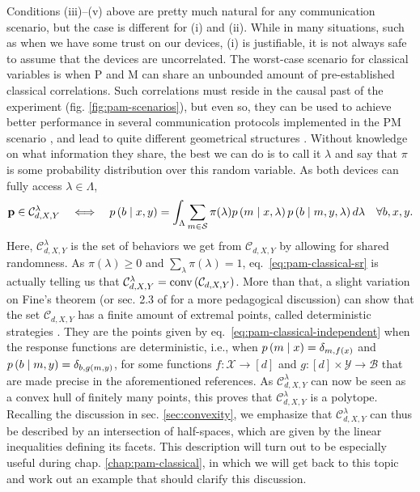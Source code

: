             Conditions (iii)--(v) above are pretty much natural for any communication scenario, but the case is different for (i) and (ii). While in many situations, such as when we have some trust on our devices, (i) is justifiable, it is not always safe to assume that the devices are uncorrelated. The worst-case scenario for classical variables is when P and M can share an unbounded amount of pre-established classical correlations. Such correlations must reside in the causal past of the experiment (fig. \ref{fig:pam-scenarios}), but even so, they can be used to achieve better performance in several communication protocols implemented in the PM scenario \cite{de_vicente_bound_2019}, and lead to quite different geometrical structures \cite{de_vicente_shared_2017,dallarno_robustness_2012}. Without knowledge on what information they share, the best we can do is to call it $\lambda$ and say that $\pi$ is some probability distribution over this random variable. As both devices can fully access $\lambda \in \Lambda$,
            \begin{equation}
                \mathbf{p} \in \mathcal{C}_{d,X,Y}^\lambda \quad\Longleftrightarrow \quad p \left( b \mid x,y \right) = \int_{\Lambda} \sum_{m \in \mathcal{S}} \pi(\lambda) p \left( m \mid x,\lambda \right) p \left( b \mid m,y,\lambda \right) d\lambda \quad\forall b,x,y .
                \label{eq:pam-classical-sr}
            \end{equation}
            Here, $\mathcal{C}_{d,X,Y}^\lambda$ is the set of behaviors we get from $\mathcal{C}_{d,X,Y}$ by allowing for shared randomness. As $\pi(\lambda) \geq 0$ and $\sum_\lambda \pi(\lambda) = 1$, eq.~\eqref{eq:pam-classical-sr} is actually telling us that $\mathcal{C}_{d,X,Y}^\lambda = \text{conv} \left( \mathcal{C}_{d,X,Y} \right)$. More than that, a slight variation on Fine's theorem \cite{fine_hidden_1982} (or sec. 2.3 of \cite{scarani_bell_2019} for a more pedagogical discussion) can show that the set $\mathcal{C}_{d,X,Y}$ has a finite amount of extremal points, called deterministic strategies \cite{gallego_pam_2010,de_vicente_bound_2019}. They are the points given by eq.~\eqref{eq:pam-classical-independent} when the response functions are deterministic, i.e., when $p \left( m \mid x \right) = \delta_{m,f(x)}$ and $ p \left( b \mid m,y \right) = \delta_{b,g(m,y)}$, for some functions $f : \mathcal{X} \rightarrow [d]$ and $g : [d] \times \mathcal{Y} \rightarrow \mathcal{B}$ that are made precise in the aforementioned references. As $\mathcal{C}_{d,X,Y}^\lambda$ can now be seen as a convex hull of finitely many points, this proves that $\mathcal{C}_{d,X,Y}^\lambda$ is a polytope. Recalling the discussion in sec. \ref{sec:convexity}, we emphasize that $\mathcal{C}_{d,X,Y}^\lambda$ can thus be described by an intersection of half-spaces, which are given by the linear inequalities defining its facets. This description will turn out to be especially useful during chap. \ref{chap:pam-classical}, in which we will get back to this topic and work out an example that should clarify this discussion.

